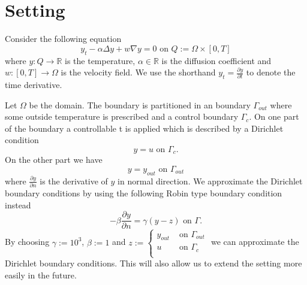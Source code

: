 \documentclass[
12pt, %
a4paper, %
onecolumn, %
portrait %
]{article}
\begin{document}
\pagestyle{myheadings} %
\markright{\doctitle} %


\thispagestyle{plain} %

\printtitle %

\section{Setting}
Consider the following equation
\begin{equation}
y_t -  \alpha \Delta y + w \nabla y = 0 \text{ on } Q := \Omega \times [0,T]
\label{eq:pde}
\end{equation}
where $y : Q \rightarrow \mathbb{R}$ is the temperature, $\alpha \in \mathbb{R}$ is the diffusion coefficient and $w : [0,T] \rightarrow \Omega$ is the velocity field. We use the shorthand $y_t = \frac{\partial y}{\partial t}$ to denote the time derivative.

Let $\Omega$ be the domain. The boundary is partitioned in an boundary $\Gamma_{out}$ where some outside temperature is prescribed and a control boundary $\Gamma_c$. On one part of the boundary a controllable t is applied which is described by a Dirichlet condition
\begin{equation}
y = u \text{ on } \Gamma_c.
\end{equation}
On the other part we have
\begin{equation}
y = y_{out} \text{ on } \Gamma_{out}
\end{equation}
where $\frac{\partial y}{\partial n}$ is the derivative of $y$ in normal direction.
We approximate the Dirichlet boundary conditions by using the following Robin type boundary condition instead
\begin{equation}
- \beta \frac{\partial y}{\partial n} = \gamma (y - z) \text{ on } \Gamma.
\label{eq:robin-bc}
\end{equation}
By choosing 
$\gamma := 10^3$, $\beta := 1$
and
$z := \begin{cases}
y_{out} &\text{ on } \Gamma_{out} \\ 
u &\text{ on } \Gamma_c \\
\end{cases}
$
we can approximate the Dirichlet boundary conditions. This will also allow us to extend the setting more easily in the future.
\end{document}
